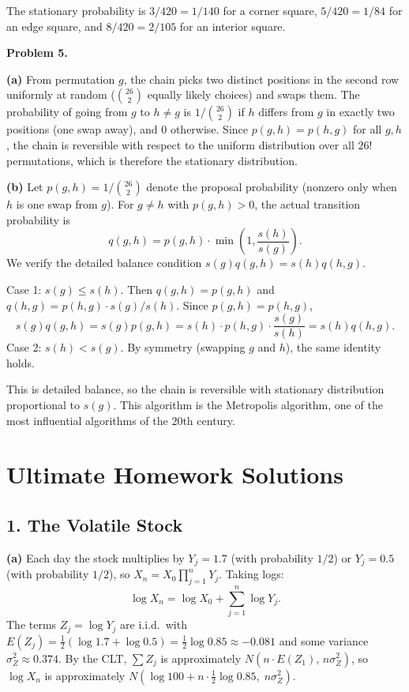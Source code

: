 \documentclass{article}
\begin{document}
The stationary probability is $3/420=1/140$ for a corner square, $5/420=1/84$ for an edge square, and $8/420=2/105$ for an interior square.

\bigskip
\textbf{Problem 5.}

\textbf{(a)} From permutation $g$, the chain picks two distinct positions in the second row uniformly at random ($\binom{26}{2}$ equally likely choices) and swaps them. The probability of going from $g$ to $h\ne g$ is $1/\binom{26}{2}$ if $h$ differs from $g$ in exactly two positions (one swap away), and $0$ otherwise. Since $p(g,h)=p(h,g)$ for all $g,h$, the chain is reversible with respect to the uniform distribution over all $26!$ permutations, which is therefore the stationary distribution.

\textbf{(b)} Let $p(g,h)=1/\binom{26}{2}$ denote the proposal probability (nonzero only when $h$ is one swap from $g$). For $g\ne h$ with $p(g,h)>0$, the actual transition probability is
$$
q(g,h)=p(g,h)\cdot\min\!\left(1,\frac{s(h)}{s(g)}\right).
$$
We verify the detailed balance condition $s(g)q(g,h)=s(h)q(h,g)$.

Case 1: $s(g)\le s(h)$. Then $q(g,h)=p(g,h)$ and $q(h,g)=p(h,g)\cdot s(g)/s(h)$. Since $p(g,h)=p(h,g)$,
$$
s(g)q(g,h)=s(g)p(g,h)=s(h)\cdot p(h,g)\cdot\frac{s(g)}{s(h)}=s(h)q(h,g).
$$
Case 2: $s(h)<s(g)$. By symmetry (swapping $g$ and $h$), the same identity holds.

This is detailed balance, so the chain is reversible with stationary distribution proportional to $s(g)$. This algorithm is the Metropolis algorithm, one of the most influential algorithms of the 20th century.

\bigskip
\section*{Ultimate Homework Solutions}

\subsection*{1. The Volatile Stock}

\textbf{(a)} Each day the stock multiplies by $Y_j=1.7$ (with probability $1/2$) or $Y_j=0.5$ (with probability $1/2$), so $X_n=X_0\prod_{j=1}^n Y_j$. Taking logs:
$$
\log X_n = \log X_0 + \sum_{j=1}^n \log Y_j.
$$
The terms $Z_j=\log Y_j$ are i.i.d.\ with $E(Z_j)=\frac{1}{2}(\log1.7+\log0.5)=\frac{1}{2}\log0.85\approx-0.081$ and some variance $\sigma_Z^2\approx0.374$. By the CLT, $\sum Z_j$ is approximately $N(n\cdot E(Z_1),\,n\sigma_Z^2)$, so $\log X_n$ is approximately $N(\log100+n\cdot\frac{1}{2}\log0.85,\;n\sigma_Z^2)$.
\end{document}
